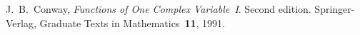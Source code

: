 %
\begin{thebibliography}{99}
J.~B.~Conway, \emph{Functions of One Complex
    Variable~I}. Second edition. Springer-Verlag, Graduate
    Texts in Mathematics~\textbf{11}, 1991.
\end{thebibliography}
